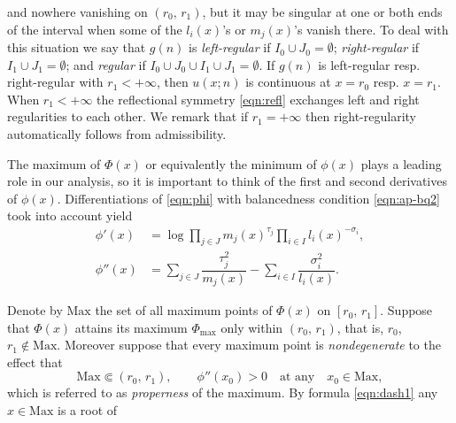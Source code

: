 \documentclass[a4paper,12pt]{article}
\theoremstyle{plain}
\def\Phim{\Phi_{\scriptstyle \mathrm{max}}}
\def\Mm{\mathrm{M{\scriptstyle ax}}}
\begin{document}
and nowhere vanishing on $(r_0, \, r_1)$, but it may be singular at one or both 
ends of the interval when some of the $l_i(x)$'s or $m_j(x)$'s vanish there.   
To deal with this situation we say that $g(n)$ is {\sl left-regular} if 
$I_0 \cup J_0 = \emptyset$;  {\sl right-regular} if $I_1 \cup J_1 = \emptyset$; 
and {\sl regular} if $I_0 \cup J_0 \cup I_1 \cup J_1 = \emptyset$. 
If $g(n)$ is left-regular resp. right-regular with $r_1 < + \infty$, then 
$u(x; n)$ is continuous at $x = r_0$ resp. $x = r_1$. 
When $r_1 < + \infty$ the reflectional symmetry \eqref{eqn:refl} exchanges 
left and right regularities to each other.       
We remark that if $r_1 = + \infty$ then right-regularity automatically follows 
from admissibility. 
\par
The maximum of $\Phi(x)$ or equivalently the minimum of $\phi(x)$ plays 
a leading role in our analysis, so it is important to think of the first 
and second derivatives of $\phi(x)$. 
Differentiations of \eqref{eqn:phi} with balancedness condition 
\eqref{eqn:ap-bq2} took into account yield      
\begin{subequations} \label{eqn:dash}
\begin{align}
\phi'(x)  &= \log \prod_{j \in J} m_j(x)^{\tau_j} \prod_{i \in I} l_i(x)^{-\sigma_i}, 
\label{eqn:dash1} \\
\phi''(x) &= \sum_{j \in J} \dfrac{\tau_j^2}{m_j(x)} - \sum_{i \in I} 
\dfrac{\sigma_i^2}{l_i(x)}. \label{eqn:dash2} 
\end{align}
\end{subequations}   
\par
Denote by $\Mm$ the set of all maximum points of $\Phi(x)$ on $[r_0, \, r_1]$. 
Suppose that $\Phi(x)$ attains its maximum $\Phim$ only within $(r_0, \, r_1)$, 
that is, $r_0$, $r_1 \not \in \Mm$.  
Moreover suppose that  every maximum point is {\sl nondegenerate} to the effect that  
\begin{equation} \label{eqn:max} 
\Mm \Subset (r_0, \, r_1), \qquad 
\phi''( x_0 ) > 0 \quad \mbox{at any} \quad x_0 \in \Mm,    
\end{equation}
which is referred to as {\sl properness} of the maximum.         
By formula \eqref{eqn:dash1} any $x \in \Mm$ is a root of   
\end{document}
